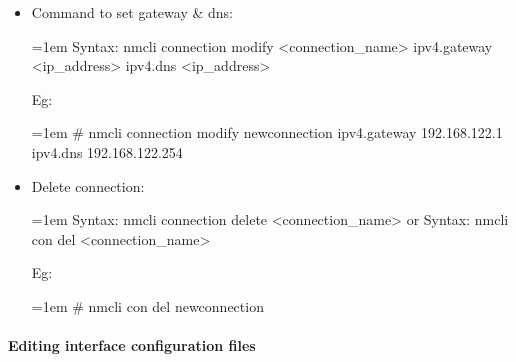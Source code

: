 \begin{flushleft}
\begin{itemize}
\begin{itemize}
		\bigskip
		\bigskip
	
		\item Command to set gateway \& dns:
		\begin{tcolorbox}[breakable,notitle,boxrule=-0pt,colback=pink,colframe=pink]
			\color{black}
			\font=1em
			Syntax: nmcli connection modify <connection\_name> ipv4.gateway <ip\_address> ipv4.dns <ip\_address>
			\font=4pt
		\end{tcolorbox}
		Eg:	
		\begin{tcolorbox}[breakable,notitle,boxrule=-0pt,colback=black,colframe=black]
			\color{green}
			\font=1em
			\# nmcli connection modify newconnection ipv4.gateway 192.168.122.1 ipv4.dns 192.168.122.254
			\font=4pt
		\end{tcolorbox}
	
		\bigskip
		\bigskip
		\item Delete connection:
		\begin{tcolorbox}[breakable,notitle,boxrule=-0pt,colback=pink,colframe=pink]
			\color{black}
			\font=1em
			Syntax: nmcli connection delete <connection\_name>
			\newline
			or
			\newline
			Syntax: nmcli con del <connection\_name>
			\font=4pt
		\end{tcolorbox}
		
		Eg:	
		\begin{tcolorbox}[breakable,notitle,boxrule=-0pt,colback=black,colframe=black]
			\color{green}
			\font=1em
			\# nmcli con del newconnection
			\font=4pt
		\end{tcolorbox}
			
	
	
	\end{itemize}
	
	
\end{itemize}




\newpage

\paragraph{Editing interface configuration files}


\end{flushleft}
